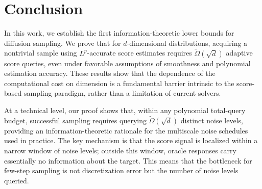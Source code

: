 \documentclass[11pt,letterpaper]{article}
\newcommand{\1}{\mathbbm{1}}
\begin{document}
\section{Conclusion}
In this work, we establish the first information-theoretic lower bounds for diffusion sampling. We prove that for $d$-dimensional distributions, acquiring a nontrivial sample using $L^p$-accurate score estimates requires $\widetilde{\Omega}(\sqrt{d})$ adaptive score queries, even under favorable assumptions of smoothness and polynomial estimation accuracy.
These results show that the dependence of the computational cost on dimension is a fundamental barrier intrinsic to the score-based sampling paradigm, rather than a limitation of current solvers.

At a technical level, our proof shows that, within any
polynomial total-query budget, successful sampling requires querying
$\widetilde{\Omega}(\sqrt{d})$ distinct noise levels, providing
an information-theoretic rationale for the multiscale noise
schedules used in practice.
The key mechanism is that the score signal is localized within a
narrow window of noise levels; outside this window, oracle
responses carry essentially no information about the target.
This means that the bottleneck for few-step sampling is not
discretization error but the number of noise levels queried.
\end{document}
